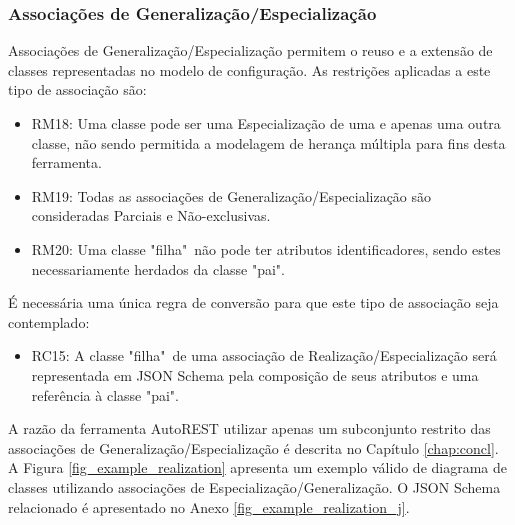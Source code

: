 
\subsubsection{Associações de Generalização/Especialização}

Associações de Generalização/Especialização permitem o reuso e a extensão de classes representadas no modelo de configuração. As restrições aplicadas a este tipo de associação são:

\begin{itemize}
    \item RM18: Uma classe pode ser uma Especialização de uma e apenas uma outra classe, não sendo permitida a modelagem de herança múltipla para fins desta ferramenta.
    
    \item RM19: Todas as associações de Generalização/Especialização são consideradas Parciais e Não-exclusivas.
    
    \item RM20: Uma classe "filha"\ não pode ter atributos identificadores, sendo estes necessariamente herdados da classe "pai".
\end{itemize}

É necessária uma única regra de conversão para que este tipo de associação seja contemplado:

\begin{itemize}
    \item RC15: A classe "filha"\ de uma associação de Realização/Especialização será representada em JSON Schema pela composição de seus atributos e uma referência à classe "pai".
\end{itemize}

A razão da ferramenta AutoREST utilizar apenas um subconjunto restrito das associações de Generalização/Especialização é descrita no Capítulo \ref{chap:concl}. A Figura \ref{fig_example_realization} apresenta um exemplo válido de diagrama de classes utilizando associações de Especialização/Generalização. O JSON Schema relacionado é apresentado no Anexo \ref{fig_example_realization_j}.

